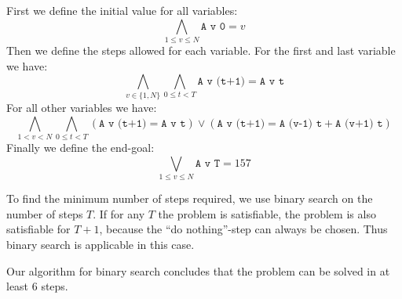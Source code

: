 \documentclass[12pt]{article}
\begin{document}
First we define the initial value for all variables:
\[ \bigwedge_{1 \le v \le N} \texttt{A v 0} = v \]
Then we define the steps allowed for each variable.
For the first and last variable we have:
\[ \bigwedge_{v \in \{1, N\}} \bigwedge_{0 \le t < T} \texttt{A v (t+1)} = \texttt{A v t} \]
For all other variables we have:
\[ \bigwedge_{1 < v < N} \bigwedge_{0 \le t < T} (\texttt{A v (t+1)} = \texttt{A v t}) \vee (\texttt{A v (t+1)} = \texttt{A (v-1) t} + \texttt{A (v+1) t}) \]
Finally we define the end-goal:
\[ \bigvee_{1 \le v \le N} \texttt{A v T} = 157 \]

To find the minimum number of steps required, we use binary search on the number of steps $T$.
If for any $T$ the problem is satisfiable, the problem is also satisfiable for $T+1$, because the ``do nothing''-step can always be chosen.
Thus binary search is applicable in this case.

Our algorithm for binary search concludes that the problem can be solved in at least 6 steps.
\end{document}

